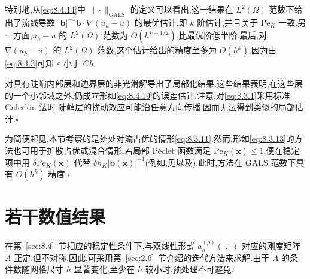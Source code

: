 特别地,从\eqref{eq:8.4.14}中 \(\|\cdot\|_{\mathrm{GALS}}\) 的定义可以看出,这一结果在 \(L^2(\Omega)\) 范数下给出了流线导数 \(|\boldsymbol{b}|^{-1}\boldsymbol{b}\cdot\nabla(u_h-u)\) 的最优估计,即 \(k\) 阶估计,并且关于 \(\mathrm{Pe}_K\) 一致.另一方面,\(u_h-u\) 的 \(L^2(\Omega)\) 范数为 \(O(h^{k+1/2})\),比最优阶低半阶.最后,对 \(\nabla(u_h-u)\) 的 \(L^2(\Omega)\) 范数,这个估计给出的精度至多为 \(O(h^k)\),因为由\eqref{eq:8.4.3}可知 \(\varepsilon\) 小于 \(Ch\).

\begin{note}
对具有陡峭内部层和边界层的非光滑解导出了局部化结果.这些结果表明,在这些层的一个小邻域之外,仍成立形如\eqref{eq:8.4.19}的误差估计.注意,对\eqref{eq:8.3.1}采用标准 Galerkin 法时,陡峭层的扰动效应可能沿任意方向传播,因而无法得到类似的局部估计.\hfill\(\square\)
\end{note}

\begin{note}
为简便起见,本节考察的是处处对流占优的情形\eqref{eq:8.3.11}.然而,形如\eqref{eq:8.3.13}的方法也可用于扩散占优或混合情形.若局部 Péclet 函数满足 \(\mathrm{Pe}_K(\boldsymbol{x})\le1\),便在稳定项中用 \(\delta\mathrm{Pe}_K(\boldsymbol{x})\) 代替 \(\delta h_K|\boldsymbol{b}(\boldsymbol{x})|^{-1}\)(例如,见以及).此时,方法在 GALS 范数下具有 \(O(h^k)\) 精度.\hfill\(\square\)
\end{note}

\section{若干数值结果}\label{sec:8.5}

在第~\ref{sec:8.4}~节相应的稳定性条件下,与双线性形式 \(a_h^{(\rho)}(\cdot,\cdot)\) 对应的刚度矩阵 \(A\) 正定,但不对称.因此,可采用第~\ref{sec:2.6}~节介绍的迭代方法来求解.由于 \(A\) 的条件数随网格尺寸 \(h\) 显著变化,至少在 \(h\) 较小时,预处理不可避免.

